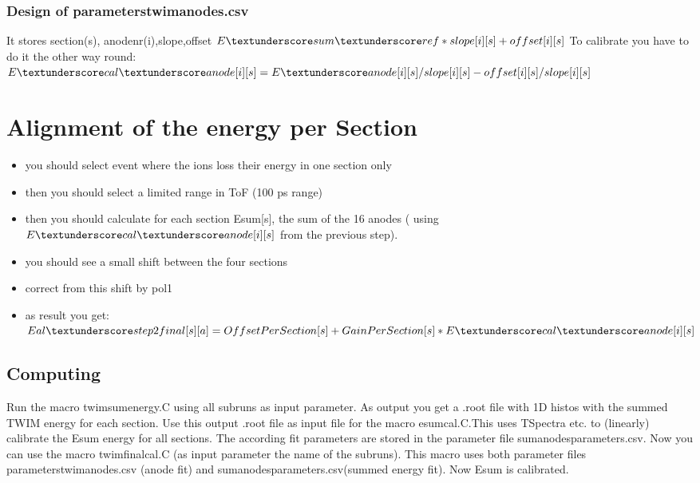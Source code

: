 \documentclass{report}
\begin{document}
\subsubsection{Design of parameters\textunderscore twim\textunderscore anodes.csv}
It stores section(s), anodenr(i),slope,offset\newline
$E\textunderscore sum\textunderscore ref*slope[i][s] + offset[i][s]$\newline
To calibrate you have to do it the other way round:\newline
$E\textunderscore cal\textunderscore anode[i][s] = E\textunderscore anode[i][s]/slope[i][s] -offset[i][s]/slope[i][s]$
\section{Alignment of the energy per Section}
\begin{itemize}
	\item you should select event where the ions loss their energy in one section only
	\item then you should select a limited range in ToF (100 ps range)
	\item then you should calculate for each section Esum[s], the sum of the 16 anodes ( using $E\textunderscore cal\textunderscore anode[i][s]$ from the previous step). 
	\item you should see a small shift between the four sections
	\item correct from this shift by pol1
	\item as result you get: $Eal\textunderscore step2final[s][a] = OffsetPerSection[s] + GainPerSection[s] * E\textunderscore cal\textunderscore anode[i][s]$
\end{itemize}
\subsection{Computing}
Run the macro \dq twim\textunderscore sum\textunderscore energy.C\dq{} using all subruns as input parameter. As output you get a .root file with 1D histos with the summed TWIM energy for each section. Use this output .root file as input file for the macro \dq e\textunderscore sum\textunderscore cal.C\dq{}.This uses TSpectra etc. to (linearly) calibrate the E\textunderscore sum energy for all sections. The according fit parameters are stored in the parameter file \dq sum\textunderscore anodes\textunderscore parameters.csv\dq{}.\newline
Now you can use the macro \dq twim\textunderscore final\textunderscore cal.C\dq{} (as input parameter the name of the subruns). This macro uses both parameter files \dq parameters\textunderscore twim\textunderscore anodes.csv (anode fit) and \dq sum\textunderscore anodes\textunderscore parameters.csv\dq{}(summed energy fit). Now E\textunderscore sum is calibrated.
\end{document}
